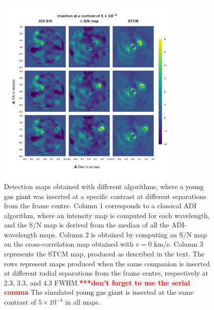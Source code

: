 \documentclass{aa}
\newcommand{\newchange}[1]{\textcolor{black}{#1}}
\begin{document}
\begin{figure}%
    \centering
    \includegraphics[width=0.8\textwidth]{Fig1_Dec_highres_noinbetween.png}
    \caption{Detection maps obtained with different algorithms, where a \newchange{young gas giant} was inserted at a specific contrast at different separations from the frame centre. Column 1 corresponds to a classical ADI algorithm, where an intensity map is computed for each wavelength, and the S/N map is derived from the median of all the ADI-wavelength maps. Column 2 is obtained by computing an S/N map on the cross-correlation map obtained with $v=0$ km/s. Column 3 represents the STCM map, produced as described in the text. The rows represent maps produced when the same companion is inserted at different radial separations from the frame centre, respectively at $2.3$, $3.3$, and $4.3$ FWHM.\textcolor{red}{\textbf{***don't forget to use the serial comma } }
    The simulated \newchange{young gas giant} is inserted at the same contrast of $5\times10^{-4}$ in all maps.}
    \label{fig:fig_1}
\end{figure}
\end{document}

